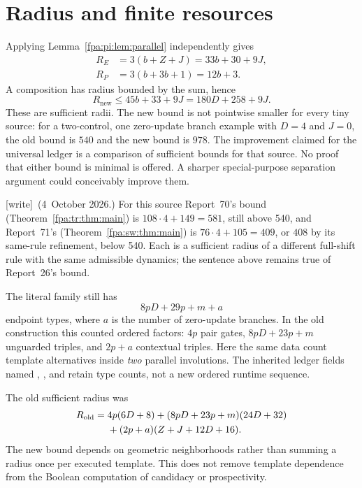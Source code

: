 \documentclass[11pt,a4paper]{article}
\numberwithin{equation}{section}
\newcommand{\file}[1]{\texttt{\detokenize{#1}}}
\newcommand{\wtag}{\textup{[write]}}
\begin{document}
\section{Radius and finite resources}\label{fpa:pi:sec:resources}
Applying Lemma~\ref{fpa:pi:lem:parallel} independently gives
\begin{align*}
 R_E&=3(b+Z+J)=33b+30+9J,\\
 R_P&=3(b+3b+1)=12b+3.
\end{align*}
A composition has radius bounded by the sum, hence
\begin{equation}\label{fpa:pi:eq:newradius}
 R_{\mathrm{new}}\le45b+33+9J=180D+258+9J.
\end{equation}
These are sufficient radii. The new bound is not pointwise smaller for every tiny source: for a two-control, one zero-update branch example with $D=4$ and $J=0$, the old bound is $540$ and the new bound is $978$. The improvement claimed for the universal ledger is a comparison of sufficient bounds for that source. No proof that either bound is minimal is offered. A sharper special-purpose separation argument could conceivably improve them.

\wtag\ (4~October 2026.) For this source Report~70's bound (Theorem~\ref{fpa:tr:thm:main}) is $108\cdot4+149=581$, still above 540, and Report~71's (Theorem~\ref{fpa:sw:thm:main}) is $76\cdot4+105=409$, or $408$ by its same-rule refinement, below 540. Each is a sufficient radius of a different full-shift rule with the same admissible dynamics; the sentence above remains true of Report~26's bound.

The literal family still has
\[
 8pD+29p+m+a
\]
endpoint types, where $a$ is the number of zero-update branches. In the old construction this counted ordered factors: $4p$ pair gates, $8pD+23p+m$ unguarded triples, and $2p+a$ contextual triples. Here the same data count template alternatives inside \emph{two} parallel involutions. The inherited ledger fields named \file{E}, \file{P}, and \file{factors} retain type counts, not a new ordered runtime sequence.

The old sufficient radius was
\begin{align}\label{fpa:pi:eq:oldradius}
 R_{\mathrm{old}}={}&4p(6D+8)+(8pD+23p+m)(24D+32)\notag\\
 &+(2p+a)(Z+J+12D+16).
\end{align}
The new bound depends on geometric neighborhoods rather than summing a radius once per executed template. This does not remove template dependence from the Boolean computation of candidacy or prospectivity.
\end{document}
